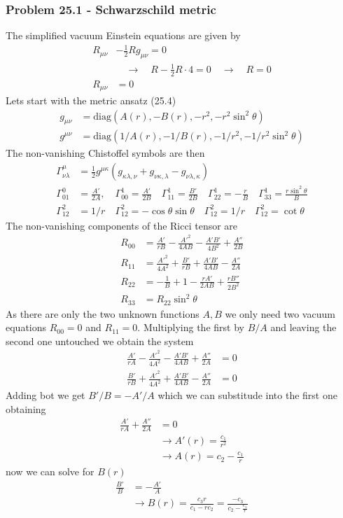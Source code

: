 \documentclass[10pt,a4paper]{book}
\theoremstyle{definition}
\begin{document}
\subsubsection{Problem 25.1 - Schwarzschild metric}
The simplified vacuum Einstein equations are given by
\begin{align}
R_{\mu\nu}&-\frac{1}{2}Rg_{\mu\nu}=0\\
&\quad\rightarrow\quad R-\frac{1}{2}R\cdot 4=0\quad\rightarrow\quad R=0\\
R_{\mu\nu}&=0
\end{align}
Lets start with the metric ansatz (25.4) 
\begin{align}
g_{\mu\nu}&=\text{diag}(A(r),-B(r),-r^2,-r^2\sin^2\theta)\\
g^{\mu\nu}&=\text{diag}(1/A(r),-1/B(r),-1/r^2,-1/r^2\sin^2\theta)
\end{align}
The non-vanishing Chistoffel symbols are then
\begin{align}
\Gamma^\mu_{\nu\lambda}&=\frac{1}{2}g^{\mu\kappa}(g_{\kappa\lambda,\nu}+g_{\nu\kappa,\lambda}-g_{\nu\lambda,\kappa})\\
\Gamma^0_{01}&=\frac{A'}{2A},\quad
\Gamma^1_{00}=\frac{A'}{2B}\quad
\Gamma^1_{11}=\frac{B'}{2B}\quad
\Gamma^1_{22}=-\frac{r}{B}\quad
\Gamma^1_{33}=\frac{r\sin^2\theta}{B}\\
\Gamma^2_{12}&=1/r\quad
\Gamma^2_{12}=-\cos\theta\sin\theta\quad
\Gamma^2_{12}=1/r\quad
\Gamma^2_{12}=\cot\theta
\end{align}
The non-vanishing components of the Ricci tensor are
\begin{align}
R_{00}&=\frac{A'}{rB}-\frac{A'^2}{4AB}-\frac{A'B'}{4B^2}+\frac{A''}{2B}\\
R_{11}&=\frac{A'^2}{4A^2}+\frac{B'}{rB}+\frac{A'B'}{4AB}-\frac{A''}{2A}\\
R_{22}&=-\frac{1}{B}+1-\frac{rA'}{2AB}+\frac{rB''}{2B^2}\\
R_{33}&=R_{22}\sin^2\theta
\end{align}
As there are only the two unknown functions $A, B$ we only need two vacuum equations $R_{00}=0$ and $R_{11}=0$. Multiplying the first by $B/A$ and leaving the second  one untouched we obtain the system
\begin{align}
\frac{A'}{rA}-\frac{A'^2}{4A^2}-\frac{A'B'}{4AB}+\frac{A''}{2A}&=0\\
\frac{B'}{rB}+\frac{A'^2}{4A^2}+\frac{A'B'}{4AB}-\frac{A''}{2A}&=0
\end{align}
Adding bot we get $B'/B=-A'/A$ which we can substitude into the first one obtaining
\begin{align}
\frac{A'}{rA}+\frac{A''}{2A}&=0\\
&\rightarrow A'(r)=\frac{c_1}{r^2}\\
&\rightarrow A(r)=c_2-\frac{c_1}{r}
\end{align}
now we can solve for $B(r)$
\begin{align}
\frac{B'}{B}&=-\frac{A'}{A}\\
&\rightarrow B(r)=\frac{c_3 r}{c_1-rc_2}=\frac{-c_3}{c_2-\frac{c_1}{r}}
\end{align}
\end{document}
